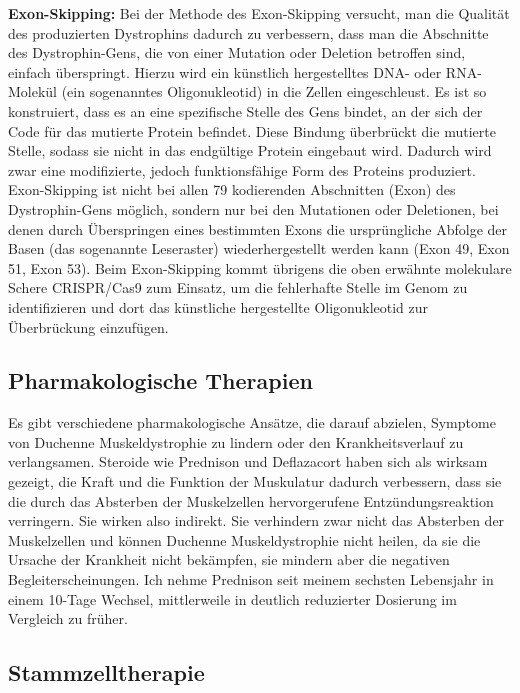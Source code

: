 \documentclass[fontsize=14pt,a4paper,headinclude,DIV=calc,automark]{scrbook}
\begin{document}
\vspace{0.5\baselineskip}

\noindent \textbf{Exon-Skipping:} Bei der Methode des Exon-Skipping versucht, man die Qualität des produzierten Dystrophins dadurch zu verbessern, dass man die Abschnitte des Dystrophin-Gens, die von einer Mutation oder Deletion betroffen sind, einfach überspringt. Hierzu wird ein künstlich hergestelltes DNA- oder RNA-Molekül (ein sogenanntes Oligonukleotid) in die Zellen eingeschleust. Es ist so konstruiert, dass es an eine spezifische Stelle des Gens bindet, an der sich der Code für das mutierte Protein befindet. Diese Bindung überbrückt die mutierte Stelle, sodass sie nicht in das endgültige Protein eingebaut wird. Dadurch wird zwar eine modifizierte, jedoch funktionsfähige Form des Proteins produziert. Exon-Skipping ist nicht bei allen 79 kodierenden Abschnitten (Exon) des Dystrophin-Gens möglich, sondern nur bei den Mutationen oder Deletionen, bei denen durch Überspringen eines bestimmten Exons die ursprüngliche Abfolge der Basen (das sogenannte Leseraster) wiederhergestellt werden kann (Exon 49, Exon 51, Exon 53). Beim Exon-Skipping kommt übrigens die oben erwähnte molekulare Schere CRISPR/Cas9 zum Einsatz, um die fehlerhafte Stelle im Genom zu identifizieren und dort das künstliche hergestellte Oligonukleotid zur Überbrückung einzufügen.

\subsection{Pharmakologische Therapien}

Es gibt verschiedene pharmakologische Ansätze, die darauf abzielen, Symptome von Duchenne Muskeldystrophie zu lindern oder den Krankheitsverlauf zu verlangsamen. Steroide wie Prednison und Deflazacort haben sich als wirksam gezeigt, die Kraft und die Funktion der Muskulatur dadurch verbessern, dass sie die durch das Absterben der Muskelzellen hervorgerufene Entzündungsreaktion verringern. Sie wirken also indirekt. Sie verhindern zwar nicht das Absterben der Muskelzellen und können Duchenne Muskeldystrophie nicht heilen, da sie die Ursache der Krankheit nicht bekämpfen, sie mindern aber die negativen Begleiterscheinungen. Ich nehme Prednison seit meinem sechsten Lebensjahr in einem 10-Tage Wechsel, mittlerweile in deutlich reduzierter Dosierung im Vergleich zu früher.

\subsection{Stammzelltherapie}
\end{document}
